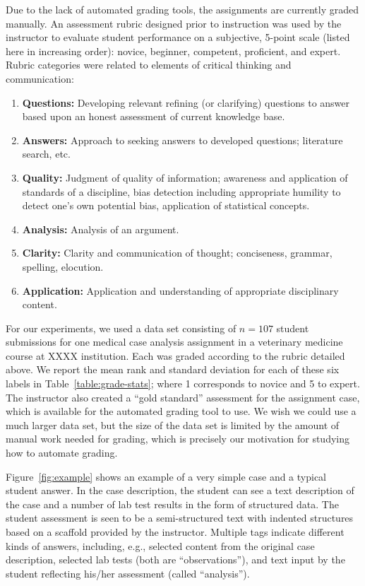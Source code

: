 Due to the lack of automated grading tools, the assignments are currently
graded manually. An assessment rubric designed prior to instruction was
used by the instructor to evaluate student performance on a subjective,
5-point scale (listed here in increasing order): novice, beginner,
competent, proficient, and expert. Rubric categories were related to
elements of critical thinking and communication:
\begin{enumerate}
\item {\bf Questions:} Developing relevant refining (or clarifying)
 questions to answer based upon an honest assessment of current knowledge
 base.
\item {\bf Answers:} Approach to seeking answers to developed
 questions; literature search, etc.
\item {\bf Quality:} Judgment of quality of information; awareness and
 application of standards of a discipline, bias detection including
 appropriate humility to detect one’s own potential bias, application of
 statistical concepts.
\item {\bf Analysis:} Analysis of an argument.
\item  {\bf Clarity:} Clarity and communication of thought; conciseness,
 grammar, spelling, elocution.
\item {\bf Application:} Application and understanding of appropriate
 disciplinary content.
\end{enumerate}




For our experiments, we used a data set consisting of $n = 107$ student submissions for one medical case
analysis assignment in a veterinary medicine course at XXXX institution.
Each was graded according to the rubric detailed above.  We report the mean
rank and standard deviation for each of these six labels in
Table~\ref{table:grade-stats}; where 1 corresponds to novice and 5 to
expert. The instructor also created a ``gold standard'' assessment for the
assignment case, which is available for the automated grading tool to use.
We wish we could use a much larger data set, but the size of the data set is limited
by the amount of manual work needed for grading, which is precisely our motivation for
studying how to automate grading.  

Figure~\ref{fig:example} shows an example of a very simple case and a typical
student answer. In the case description, the student can see a text
description of the case and a number of lab test results in the form of
structured data. The student assessment is seen to be a semi-structured
text with indented structures based on a scaffold provided by the
instructor. Multiple tags indicate different kinds of answers, including,
e.g., selected content from the original case description, selected lab
tests (both are ``observations''), and text input by the student reflecting
his/her assessment (called ``analysis'').


